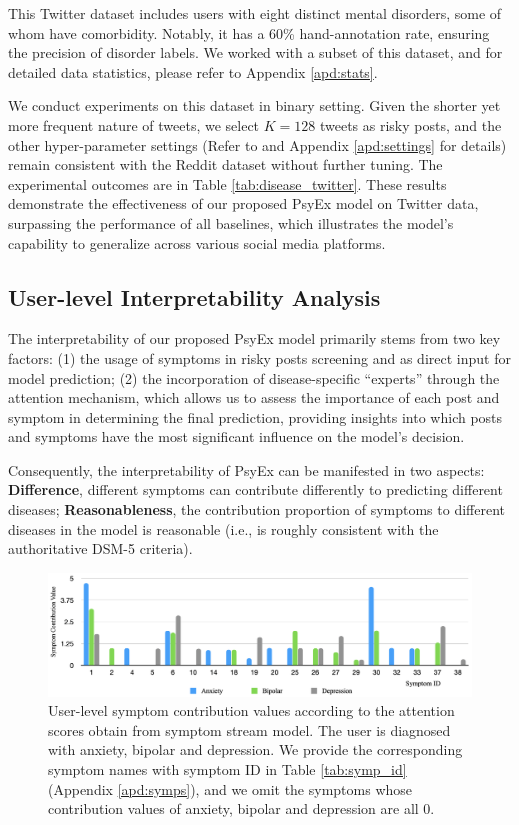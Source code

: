 This Twitter dataset includes users with eight distinct mental disorders, some of whom have comorbidity. Notably, it has a 60\% hand-annotation rate, ensuring the precision of disorder labels. We worked with a subset of this dataset, and for detailed data statistics, please refer to Appendix \ref{apd:stats}.

We conduct experiments on this dataset in binary setting. Given the shorter yet more frequent nature of tweets, we select $K=128$ tweets as risky posts, and the other hyper-parameter settings (Refer to  and Appendix \ref{apd:settings} for details) remain consistent with the Reddit dataset without further tuning. The experimental outcomes are in Table \ref{tab:disease_twitter}. These results demonstrate the effectiveness of our proposed PsyEx model on Twitter data, surpassing the performance of all baselines, which illustrates the model's capability to generalize across various social media platforms.

\subsection{User-level Interpretability Analysis}
\label{sec:interpret}

The interpretability of our proposed PsyEx model primarily stems from two key factors: (1) the usage of symptoms in risky posts screening and as direct input for model prediction; (2) the incorporation of disease-specific ``experts'' through the attention mechanism, which allows us to assess the importance of each post and symptom in determining the final prediction, providing insights into which posts and symptoms have the most significant influence on the model's decision.

Consequently, the interpretability of PsyEx can be manifested in two aspects: \textbf{Difference}, different symptoms can contribute differently to predicting different diseases; \textbf{Reasonableness}, the contribution proportion of symptoms to different diseases in the model is reasonable (i.e., is roughly consistent with the authoritative DSM-5 criteria). 

\begin{figure}[th]
    \centering
    \includegraphics[width=\linewidth]{figures/symptom_stream_score.png}
    \caption{User-level symptom contribution values according to the attention scores obtain from symptom stream model. The user is diagnosed with anxiety, bipolar and depression. We provide the corresponding symptom names with symptom ID in Table \ref{tab:symp_id} (Appendix \ref{apd:symps}), and we omit the symptoms whose contribution values of anxiety, bipolar and depression are all 0.}
    \label{fig:symp_stream_score}
\end{figure}

